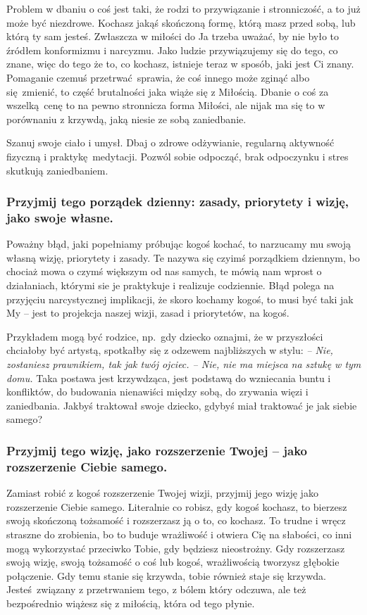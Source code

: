 \documentclass[../dotknieci-miloscia.tex]{subfiles}
\begin{document}
Problem w dbaniu o coś jest taki, że rodzi to przywiązanie i stronniczość, a to już może być niezdrowe.
Kochasz jakąś skończoną formę, którą masz przed sobą, lub którą ty sam jesteś. 
Zwłaszcza w miłości do Ja trzeba uważać, by nie było to źródłem konformizmu i narcyzmu.
Jako ludzie przywiązujemy się do tego, co znane, 
więc do tego że to, co kochasz, istnieje teraz w sposób, jaki jest Ci znany.
Pomaganie czemuś przetrwać sprawia, że coś innego może zginąć albo się zmienić, 
to część brutalności jaka wiąże się z Miłością.
Dbanie o coś za wszelką cenę to na pewno stronnicza forma Miłości, 
ale nijak ma się to w porównaniu z krzywdą, jaką niesie ze sobą zaniedbanie.

Szanuj swoje ciało i umysł. Dbaj o zdrowe odżywianie, regularną aktywność fizyczną i praktykę medytacji.
Pozwól sobie odpocząć, brak odpoczynku i stres skutkują zaniedbaniem.

\subsubsection{Przyjmij tego porządek dzienny: zasady, priorytety i wizję, jako swoje własne.}
Poważny błąd, jaki popełniamy próbując kogoś kochać, 
to narzucamy mu swoją własną wizję, priorytety i zasady.
Te nazywa się czyimś porządkiem dziennym, bo chociaż mowa o czymś większym od nas samych, 
te mówią nam wprost o działaniach, którymi sie je praktykuje i realizuje codziennie.
Błąd polega na przyjęciu narcystycznej implikacji, że skoro kochamy kogoś, to musi być taki jak My 
-- jest to projekcja naszej wizji, zasad i priorytetów, na kogoś.

Przykładem mogą być rodzice, np.\ gdy dziecko oznajmi, że w przyszłości chciałoby być artystą, 
spotkałby się z odzewem najbliższych w stylu: 
\emph{
    -- Nie, zostaniesz prawnikiem, tak jak twój ojciec. 
    -- Nie, nie ma miejsca na sztukę w tym domu.}
Taka postawa jest krzywdząca, jest podstawą do wzniecania buntu i konfliktów, 
do budowania nienawiści między sobą, do zrywania więzi i zaniedbania.
Jakbyś traktował swoje dziecko, gdybyś miał traktować je jak siebie samego?

\subsubsection{Przyjmij tego wizję, jako rozszerzenie Twojej -- jako rozszerzenie Ciebie samego.}
Zamiast robić z kogoś rozszerzenie Twojej wizji, 
przyjmij jego wizję jako rozszerzenie Ciebie samego.
Literalnie co robisz, gdy kogoś kochasz, 
to bierzesz swoją skończoną tożsamość i rozszerzasz ją o to, co kochasz.
To trudne i wręcz straszne do zrobienia, bo to buduje wrażliwość i otwiera Cię na słabości, 
co inni mogą wykorzystać przeciwko Tobie, gdy będziesz nieostrożny.
Gdy rozszerzasz swoją wizję, swoją tożsamość o coś lub kogoś, 
wrażliwością tworzysz głębokie połączenie.
Gdy temu stanie się krzywda, tobie również staje się krzywda.
Jesteś związany z przetrwaniem tego, z bólem który odczuwa, 
ale też bezpośrednio wiążesz się z miłością, która od tego płynie.
\end{document}
